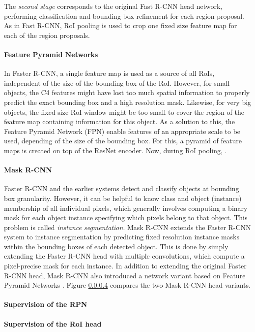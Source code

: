 The \emph{second stage} corresponds to the original Fast R-CNN head network, performing classification
and bounding box refinement for each region proposal. %
As in Fast R-CNN, RoI pooling is used to crop one fixed size feature map for each of the region proposals.

\paragraph{Feature Pyramid Networks}
In Faster R-CNN, a single feature map is used as a source of all RoIs, independent
of the size of the bounding box of the RoI.
However, for small objects, the C4  features
might have lost too much spatial information to properly predict the exact bounding
box and a high resolution mask. Likewise, for very big objects, the fixed size
RoI window might be too small to cover the region of the feature map containing
information for this object.
As a solution to this, the Feature Pyramid Network (FPN) \cite{FPN} enable features
of an appropriate scale to be used, depending of the size of the bounding box.
For this, a pyramid of feature maps is created on top of the ResNet \cite{ResNet}
encoder. 
Now, during RoI pooling,
.


\paragraph{Mask R-CNN}
Faster R-CNN and the earlier systems detect and classify objects at bounding box granularity.
However, it can be helpful to know class and object (instance) membership of all individual pixels,
which generally involves computing a binary mask for each object instance specifying which pixels belong
to that object. This problem is called \emph{instance segmentation}.
Mask R-CNN \cite{MaskRCNN} extends the Faster R-CNN system to instance segmentation by predicting
fixed resolution instance masks within the bounding boxes of each detected object.
This is done by simply extending the Faster R-CNN head with multiple convolutions, which
compute a pixel-precise mask for each instance.
In addition to extending the original Faster R-CNN head, Mask R-CNN also introduced a network
variant based on Feature Pyramid Networks \cite{FPN}.
Figure \ref{} compares the two Mask R-CNN head variants.


\paragraph{Supervision of the RPN}

\paragraph{Supervision of the RoI head}
